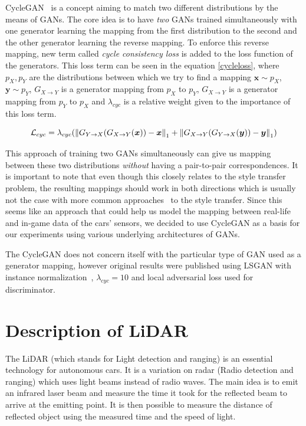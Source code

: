 CycleGAN~\cite{cyclegan} is a concept aiming to match two different distributions by the means of GANs. The core idea is to have {\em two} GANs trained simultaneously with one generator learning the mapping from the first distribution to the second and the other generator learning the reverse mapping. To enforce this reverse mapping, new term called {\em cycle consistency loss} is added to the loss function of the generators. This loss term can be seen in the equation \ref{cycleloss}, where $p_X, p_Y$ are the distributions between which we try to find a mapping $\bm{x}\sim p_X$, $\bm{y}\sim p_Y$, $G_{X\rightarrow Y}$ is a generator mapping from $p_X$ to $p_Y$, $G_{X\rightarrow Y}$ is a generator mapping from $p_Y$ to $p_X$ and $\lambda_{cyc}$ is a relative weight given to the importance of this loss term.

\begin{equation}
\mathcal{L}_{cyc} = \lambda_{cyc}(\left\lVert G_{Y\rightarrow X}(G_{X\rightarrow Y}(\bm{x})) - \bm{x}\right\rVert_1 + \left\lVert G_{X\rightarrow Y}(G_{Y\rightarrow X}(\bm{y})) - \bm{y}\right\rVert_1)
\label{cycleloss}
\end{equation}

This approach of training two GANs simultaneously can give us mapping between these two distributions {\em without} having a pair-to-pair correspondences. It is important to note that even though this closely relates to the style transfer problem, the resulting mappings should work in both directions which is usually not the case with more common approaches~\cite{artstyle} to the style transfer. Since this seems like an approach that could help us model the mapping between real-life and in-game data of the cars' sensors, we decided to use CycleGAN as a basis for our experiments using various underlying architectures of GANs.

The CycleGAN does not concern itself with the particular type of GAN used as a generator mapping, however original results were published using LSGAN with instance normalization~\cite{instancenorm}, $\lambda_{cyc} = 10$ and local adversarial loss used for discriminator.

\section{Description of LiDAR}

The LiDAR (which stands for Light detection and ranging) is an essential technology for autonomous cars. It is a variation on radar (Radio detection and ranging) which uses light beams instead of radio waves. The main idea is to emit an infrared laser beam and measure the time it took for the reflected beam to arrive at the emitting point. It is then possible to measure the distance of reflected object using the measured time and the speed of light.

